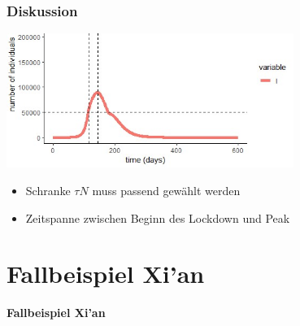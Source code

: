 \documentclass{beamer}
\begin{document}
\begin{frame}
	\frametitle{Diskussion}

	 \begin{center}
            \includegraphics[width=0.7\textwidth]{thres-I}
	\end{center}

\begin{itemize}
\item Schranke $\tau N$ muss passend gewählt werden
\item Zeitspanne zwischen Beginn des Lockdown und Peak 
\end{itemize}


\end{frame}




\section{Fallbeispiel Xi'an}

\begin{frame}
\centering
 \huge\textbf{Fallbeispiel Xi'an}
\end{frame}
\end{document}
